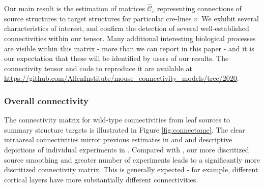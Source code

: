 Our main result is the estimation of matrices $\hat {\mathcal C}_v$ representing connections of source structures to target structures for particular cre-lines $v$. 
We exhibit several characteristics of interest, and confirm the detection of several well-established connectivities within our tensor.
Many additional interesting biological processes are visible within this matrix - more than we can report in this paper - and it is our expectation that these will be identified by users of our results.
The connectivity tensor and code to reproduce it are available at \url{https://github.com/AllenInstitute/mouse_connectivity_models/tree/2020}.

\subsubsection{Overall connectivity}

The connectivity matrix for wild-type connectivities from leaf sources to summary structure targets is illustrated in Figure \ref{fig:connectome}.
The clear intraareal connectivities mirror previous estimates in \citet{Oh2014-kh} and \citet{Knox2019-ot} and descriptive depictions of individual experiments in \citet{Harris2019-mr}.
Compared with \citet{Knox2019-ot}, our more discritized source smoothing and greater number of experiments leads to a significantly more discritized connectivity matrix.
This is generally expected - for example, different cortical layers have more substantially different connectivities.


\newpage

